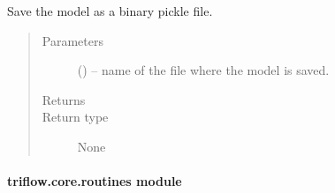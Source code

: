 \documentclass[letterpaper,10pt,english]{sphinxmanual}
\begin{document}
\begin{fulllineitems}
\begin{fulllineitems}
\end{fulllineitems}


\begin{fulllineitems}
\label{\detokenize{triflow.core:triflow.core.model.Model.save}}
Save the model as a binary pickle file.
\begin{quote}\begin{description}
\item[{Parameters}] \leavevmode
{} () -- name of the file where the model is saved.

\item[{Returns}] \leavevmode


\item[{Return type}] \leavevmode
None

\end{description}\end{quote}

\end{fulllineitems}


\end{fulllineitems}



\paragraph{triflow.core.routines module}
\label{\detokenize{triflow.core:triflow-core-routines-module}}\label{\detokenize{triflow.core:module-triflow.core.routines}}
\end{document}

